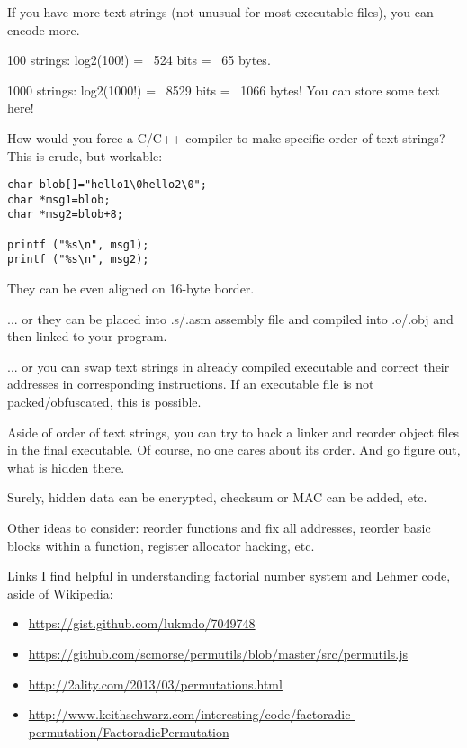 If you have more text strings (not unusual for most executable files), you can encode more.

100 strings: log2(100!) = ~524 bits = ~65 bytes.

1000 strings: log2(1000!) = ~8529 bits = ~1066 bytes! You can store some text here!

How would you force a C/C++ compiler to make specific order of text strings?
This is crude, but workable:

\begin{lstlisting}
char blob[]="hello1\0hello2\0";
char *msg1=blob;
char *msg2=blob+8;

printf ("%s\n", msg1);
printf ("%s\n", msg2);
\end{lstlisting}

They can be even aligned on 16-byte border.

... or they can be placed into .s/.asm assembly file and compiled into .o/.obj and then linked to your program.

... or you can swap text strings in already compiled executable and correct their addresses in corresponding instructions.
If an executable file is not packed/obfuscated, this is possible.

Aside of order of text strings, you can try to hack a linker and reorder object files in the final executable.
Of course, no one cares about its order.
And go figure out, what is hidden there.

Surely, hidden data can be encrypted, checksum or MAC can be added, etc.

Other ideas to consider: reorder functions and fix all addresses,
reorder basic blocks within a function, register allocator hacking, etc.

Links I find helpful in understanding factorial number system and Lehmer code, aside of Wikipedia:

\begin{itemize}
\item \url{https://gist.github.com/lukmdo/7049748}
\item \url{https://github.com/scmorse/permutils/blob/master/src/permutils.js}
\item \url{http://2ality.com/2013/03/permutations.html}
\item \url{http://www.keithschwarz.com/interesting/code/factoradic-permutation/FactoradicPermutation}
\end{itemize}


